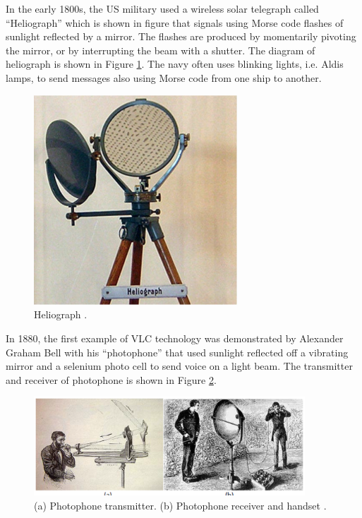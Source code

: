 In the early 1800s, the US military used a wireless solar telegraph called “Heliograph” which is shown in figure that signals using
Morse code flashes of sunlight reflected by a mirror. The flashes are produced by momentarily pivoting the mirror, or by interrupting the beam with a shutter. The diagram of heliograph is shown in Figure \ref{helio}. The navy often uses blinking lights, i.e. Aldis lamps, to
send messages also using Morse code from one ship to another.
\begin{figure}[h]
\begin{center}
\includegraphics[width=3.0in]{heliograph.eps}
\caption{Heliograph \cite{r17}.} \label{helio}
\end{center}
\end{figure}


In 1880, the first example of VLC technology was demonstrated by Alexander Graham Bell with his “photophone” that used sunlight
reflected off a vibrating mirror and a selenium photo cell to send voice on a light beam. The transmitter and receiver of photophone is shown in Figure \ref{sun}.
\begin{figure}[h]
\begin{center}
\includegraphics[width=4.0in]{sunlight.eps}
\caption{(a) Photophone transmitter. (b) Photophone receiver and handset \cite{r17}.} \label{sun}
\end{center}
\end{figure}

